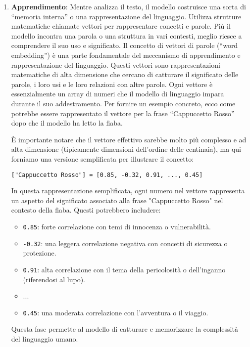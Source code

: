 \begin{enumerate}
                \item
                    \textbf{Apprendimento}: Mentre analizza il testo, il modello costruisce una sorta di ``memoria interna'' o una rappresentazione del linguaggio. Utilizza strutture matematiche chiamate vettori per rappresentare concetti e parole. Più il modello incontra una parola o una struttura in vari contesti, meglio riesce a comprendere il suo uso e significato. Il concetto di vettori di parole (``word embedding'') è una parte fondamentale del meccanismo di apprendimento e rappresentazione del linguaggio. Questi vettori sono rappresentazioni matematiche di alta dimensione che cercano di catturare il significato delle parole, i loro usi e le loro relazioni con altre parole. Ogni vettore è essenzialmente un array di numeri che il modello di linguaggio impara durante il suo addestramento. Per fornire un esempio concreto, ecco come potrebbe essere rappresentato il vettore per la frase ``Cappuccetto Rosso'' dopo che il modello ha letto la fiaba.

                    È importante notare che il vettore effettivo sarebbe molto più complesso e ad alta dimensione (tipicamente dimensioni dell'ordine delle centinaia), ma qui forniamo una versione semplificata per illustrare il concetto:

                    \texttt{["Cappuccetto Rosso"] = [0.85, -0.32, 0.91, ..., 0.45]}

                    In questa rappresentazione semplificata, ogni numero nel vettore rappresenta un aspetto del significato associato alla frase "Cappuccetto Rosso" nel contesto della fiaba. Questi potrebbero includere:
                    \begin{itemize}
                        \item \texttt{0.85}: forte correlazione con temi di innocenza o vulnerabilità.
                        \item \texttt{-0.32}: una leggera correlazione negativa con concetti di sicurezza o protezione.
                        \item \texttt{0.91}: alta correlazione con il tema della pericolosità o dell'inganno (riferendosi al lupo).
                        \item ...
                        \item \texttt{0.45}: una moderata correlazione con l'avventura o il viaggio.
                    \end{itemize}
                    Questa fase permette al modello di catturare e memorizzare la complessità del linguaggio umano.


\end{enumerate}
